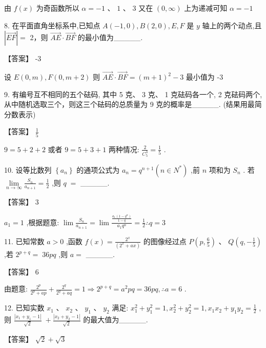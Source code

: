 \documentclass[10pt]{article}
\begin{document}
由 \(f\left( x\right)\) 为奇函数所以 \(\alpha  =  - 1\text{ 、 }1\text{ 、 }3\) 又在 \(\left( {0,\infty }\right)\) 上为递减可知 \(\alpha  =  - 1\)

8. 在平面直角坐标系中,已知点 \(A\left( {-1,0}\right) ,B\left( {2,0}\right) ,E,F\) 是 \(y\) 轴上的两个动点,且 \(\left| \overrightarrow{EF}\right|  =\) 2，则 \(\overrightarrow{AE} \cdot  \overrightarrow{BF}\) 的最小值为\_\_\_\_\_.

【答案】 -3

设 \(E\left( {0,m}\right) ,F\left( {0,m + 2}\right)\) 则 \(\overrightarrow{AE} \cdot  \overrightarrow{BF} = {\left( m + 1\right) }^{2} - 3\) 最小值为 -3

9. 有编号互不相同的五个砝码, 其中 5 克、 3 克、 1 克砝码各一个, 2 克砝码两个, 从中随机选取三个，则这三个砝码的总质量为 9 克的概率是\_\_\_\_\_. (结果用最简分数表示)

【答案】 \(\frac{1}{5}\)

\(9 = 5 + 2 + 2\) 或者 \(9 = 5 + 3 + 1\) 两种情况: \(\frac{2}{{C}_{5}^{3}} = \frac{1}{5}\) .

10. 设等比数列 \(\left\{  {a}_{n}\right\}\) 的通项公式为 \({a}_{n} = {q}^{n + 1}\left( {n \in  {N}^{ * }}\right)\) ,前 \(n\) 项和为 \({S}_{n}\) . 若 \(\mathop{\lim }\limits_{{n \rightarrow  \infty }}\frac{{S}_{n}}{{a}_{n + 1}} = \frac{1}{2}\) ,则 \(q \; =\) \_\_\_\_\_.

【答案】 3

\({a}_{1} = 1\) ,根据题意: \(\lim \frac{{S}_{n}}{{a}_{n + 1}} = \lim \frac{\frac{{a}_{1}\left( {1 - {q}^{n}}\right) }{1 - q}}{{a}_{1}{q}^{n}} = \frac{1}{2}\therefore q = 3\)

11. 已知常数 \(a > 0\) ,函数 \(f\left( x\right)  = \frac{{2}^{x}}{\left( {2}^{x} + ax\right) }\) 的图像经过点 \(P\left( {p,\frac{6}{5}}\right) \text{ 、 }Q\left( {q, - \frac{1}{5}}\right)\) ,若 \({2}^{p + q} = \; {36pq}\) ,则 \(a =\) \_\_\_\_\_.

【答案】 6

由题意: \(\frac{{2}^{p}}{{2}^{p} + {ap}} + \frac{{2}^{q}}{{2}^{q} + {aq}} = 1 \Rightarrow  {2}^{p + q} = {a}^{2}{pq} = {36pq},\therefore a = 6\) .

12. 已知实数 \({x}_{1}\text{ 、 }{x}_{2}\text{ 、 }{y}_{1}\text{ 、 }{y}_{2}\) 满足: \({x}_{1}^{2} + {y}_{1}^{2} = 1,{x}_{2}^{2} + {y}_{2}^{2} = 1,{x}_{1}{x}_{2} + {y}_{1}{y}_{2} = \frac{1}{2}\) ,则 \(\frac{\left| {x}_{1} + {y}_{1} - 1\right| }{\sqrt{2}} \; + \frac{\left| {x}_{2} + {y}_{2} - 1\right| }{\sqrt{2}}\) 的最大值为\_\_\_\_\_.

【答案】 \(\sqrt{2} + \sqrt{3}\)
\end{document}
